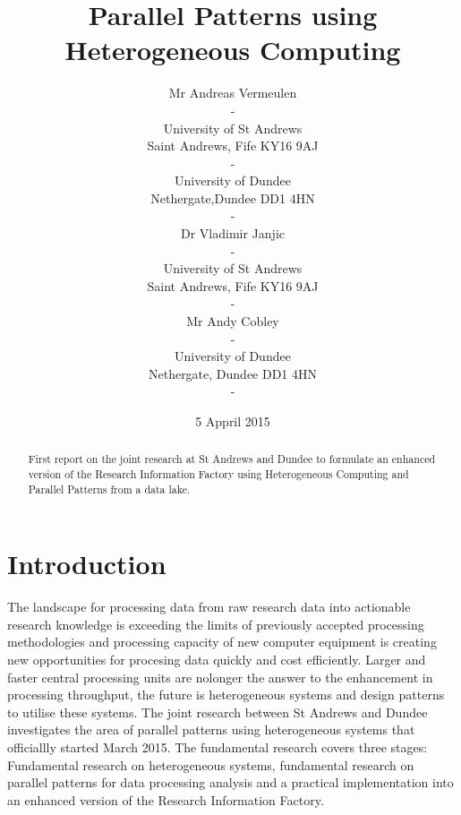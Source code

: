 \documentclass{acm_proc_article-sp}
\begin{document}
\title{Parallel Patterns using Heterogeneous Computing}
\subtitle{}
\author{
\alignauthor
Mr Andreas Vermeulen\\
\affaddr -\\
\affaddr University of St Andrews\\
\affaddr Saint Andrews, Fife KY16 9AJ\\
\affaddr -\\
\affaddr University of Dundee\\
\affaddr Nethergate,Dundee DD1 4HN\\
\affaddr -\\
\alignauthor
Dr Vladimir Janjic\\
\affaddr -\\
\affaddr University of St Andrews\\
\affaddr Saint Andrews, Fife KY16 9AJ\\
\affaddr -\\
\alignauthor
Mr Andy Cobley\\
\affaddr -\\
\affaddr University of Dundee\\
\affaddr Nethergate, Dundee DD1 4HN\\
\affaddr -\\
}
\date{5 Appril 2015}
\maketitle
\begin{abstract}
First report on the joint research at St Andrews and Dundee to formulate an enhanced version of the Research Information Factory using Heterogeneous Computing and Parallel Patterns from a data lake.
\end{abstract}
\section{Introduction}
The landscape for processing data from raw research data into actionable research knowledge is exceeding the limits of previously accepted processing methodologies and processing capacity of new computer equipment is creating new opportunities for procesing data quickly and cost efficiently. Larger and faster central processing units are nolonger the answer to the enhancement in processing throughput, the future is heterogeneous systems and design patterns to utilise these systems. The joint research between St Andrews and Dundee investigates the area of parallel patterns using heterogeneous systems that officiallly started March 2015. The fundamental research covers three stages:
Fundamental research on heterogeneous systems, fundamental research on parallel patterns for data processing analysis and a practical implementation into an enhanced version of the Research Information Factory. 
\end{document}
